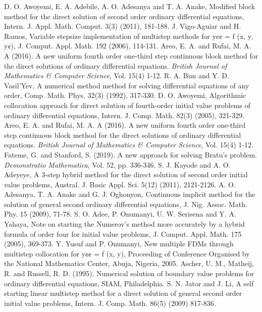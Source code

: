 \documentclass[12pt]{report}
\begin{document}
\begin{thebibliography}{99}
	D. O. Awoyemi, E. A. Adebile, A. O. Adesanya and T. A. Anake, Modified block method for the direct solution of second order ordinary differential equations, Intern. J. Appl. Math. Comput. 3(3) (2011), 181-188.
	J. Vigo-Aguiar and H. Ramos, Variable stepsize implementation of multistep methods for y¢¢ = f (x, y, y¢), J. Comput. Appl. Math. 192 (2006), 114-131.
	Areo, E. A. and Rufai, M. A. A (2016). A new uniform fourth order one-third step continuous block method for the direct solutions of ordinary differential equations. \textit{British Journal of Mathematics \& Computer Science}, Vol. 15(4) 1-12.
	R. A. Bun and Y. D. Vasil’Yev, A numerical method method for solving differential
equations of any order, Comp. Math. Phys. 32(3) (1992), 317-330.
	D. O. Awoyemi, Algorithmic collocation approach for direct solution of fourth-order initial value problems of ordinary differential equations, Intern. J. Comp. Math. 82(3) (2005), 321-329.
	Areo, E. A. and Rufai, M. A. A (2016). A new uniform fourth order one-third step continuous block method for the direct solutions of ordinary differential equations. \textit{British Journal of Mathematics \& Computer Science}, Vol. 15(4) 1-12.
	Fateme, G. and Stanford, S. (2019). A new approach for solving Bratu’s problem. \textit{Demonstratio Mathematica}, Vol. 52, pp. 336-346.
	S. J. Kayode and A. O. Adeyeye, A 3-step hybrid method for the direct solution of second order initial value problems, Austral. J. Basic Appl. Sci. 5(12) (2011), 2121-2126.
	A. O. Adesanya, T. A. Anake and G. J. Oghonyon, Continuous implicit method for the solution of general second ordinary differential equations, J. Nig. Assoc. Math. Phy. 15 (2009), 71-78.
	S. O. Adee, P. Onumanyi, U. W. Serisena and Y. A. Yahaya, Note on starting the Numerov’s method more accurately by a hybrid formula of order four for initial value problems, J. Comput. Appl. Math. 175 (2005), 369-373.
	Y. Yusuf and P. Onumanyi, New multiple FDMs through multistep collocation for y¢¢ = f (x, y), Proceeding of Conference Organised by the National Mathematics Center, Abuja, Nigeria, 2005.
	Ascher, U. M., Matheij, R. and Russell, R. D. (1995). Numerical solution of boundary value problems for ordinary differential equations, SIAM, Philadelphia.
	S. N. Jator and J. Li, A self starting linear multistep method for a direct solution of general second order initial value problems, Intern. J. Comp. Math. 86(5) (2009) 817-836.

\end{thebibliography}
\end{document}
